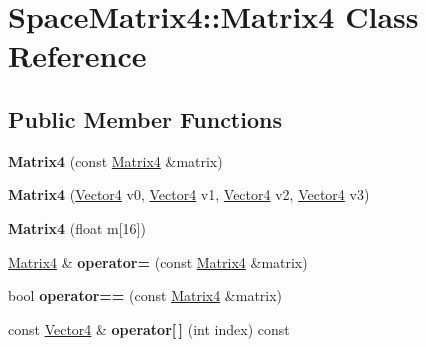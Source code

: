 \hypertarget{class_space_matrix4_1_1_matrix4}{}\section{Space\+Matrix4\+:\+:Matrix4 Class Reference}
\label{class_space_matrix4_1_1_matrix4}
\subsection*{Public Member Functions}
\begin{DoxyCompactItemize}
\item 
\mbox{\label{class_space_matrix4_1_1_matrix4_ae3b3ede099369c664e4ed51ec181437d}} 
{\bfseries Matrix4} (const \mbox{\hyperlink{class_space_matrix4_1_1_matrix4}{Matrix4}} \&matrix)
\item 
\mbox{\label{class_space_matrix4_1_1_matrix4_ad02fd76e843b890744b950e73fc0c4a2}} 
{\bfseries Matrix4} (\mbox{\hyperlink{class_space_vector4_1_1_vector4}{Vector4}} v0, \mbox{\hyperlink{class_space_vector4_1_1_vector4}{Vector4}} v1, \mbox{\hyperlink{class_space_vector4_1_1_vector4}{Vector4}} v2, \mbox{\hyperlink{class_space_vector4_1_1_vector4}{Vector4}} v3)
\item 
\mbox{\label{class_space_matrix4_1_1_matrix4_a4e95830c4932dbeba8ba5634bdb43740}} 
{\bfseries Matrix4} (float m\mbox{[}16\mbox{]})
\item 
\mbox{\label{class_space_matrix4_1_1_matrix4_acb7db0fb04a6088c08e14f2fe303f1c7}} 
\mbox{\hyperlink{class_space_matrix4_1_1_matrix4}{Matrix4}} \& {\bfseries operator=} (const \mbox{\hyperlink{class_space_matrix4_1_1_matrix4}{Matrix4}} \&matrix)
\item 
\mbox{\label{class_space_matrix4_1_1_matrix4_ae53e7683f380bb20dd16150bc065eac2}} 
bool {\bfseries operator==} (const \mbox{\hyperlink{class_space_matrix4_1_1_matrix4}{Matrix4}} \&matrix)
\item 
\mbox{\label{class_space_matrix4_1_1_matrix4_aa24d8b4b5168739faedb27ea94608f47}} 
const \mbox{\hyperlink{class_space_vector4_1_1_vector4}{Vector4}} \& {\bfseries operator\mbox{[}$\,$\mbox{]}} (int index) const

\end{DoxyCompactItemize}
